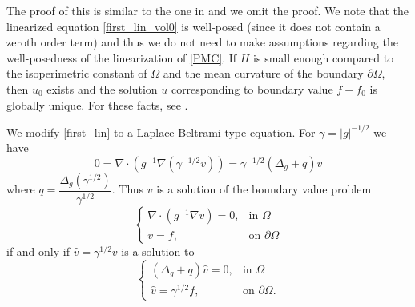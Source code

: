 \documentclass[a4paper, 10pt, twoside, notitlepage]{amsart}
\theoremstyle{plain}
\newcommand{\Om}{\Omega}
\numberwithin{equation}{section}
\newcommand {\p} {\partial}
\newcommand{\abs}[1]{\lvert #1 \rvert}
\newcommand{\chr}[2]{\Gamma^{#1}_{\hphantom{#1}#2}}
\begin{document}
The proof of this is similar to the one in \cite{liimatainenLin2024} and we omit the proof. We note that the linearized equation \eqref{first_lin_vol0} is well-posed (since it does not contain a zeroth order term) and thus we do not need to make assumptions regarding the well-posedness of the linearization of \eqref{PMC}. If $H$ is small enough compared to the isoperimetric constant of $\Omega$ and the mean curvature of the boundary $\p \Omega$, then $u_0$ exists and the solution $u$ corresponding to boundary value $f+f_0$ is globally unique. For these facts, see \cite[Theorem 16.10, and (16.61)]{gilbarg2001elliptic}.

We modify \eqref{first_lin} to a Laplace-Beltrami type equation. 
For $\gamma=\abs{g}^{-1/2}$ we have
\begin{equation*}
	0=\nabla\cdot\left(g^{-1}\nabla(\gamma^{-1/2}v)\right) = \gamma^{-1/2}(\Delta_g + q)v
\end{equation*}
where $q=\dfrac{\Delta_g(\gamma^{1/2})}{\gamma^{1/2}}$. Thus $v$ is a solution of the boundary value problem 
\begin{equation}\label{first_lin_divergence}
	\left\{\begin{array}{ll}
		\nabla\cdot\left(g^{-1}\nabla v\right)=0, & \text{in}\,\, \Om \\
		v=f, & \text{on}\,\, \partial\Om
	\end{array} \right.
\end{equation}
if and only if $\hat{v}=\gamma^{1/2}v$ is a solution to
\begin{equation}\label{first_lin_schrödinger}
	\left\{\begin{array}{ll}
		(\Delta_g + q)\hat{v}=0, & \text{in}\,\, \Om \\
		\hat{v}=\gamma^{1/2}f, & \text{on}\,\, \partial\Om.
	\end{array} \right.
\end{equation}




\end{document}
